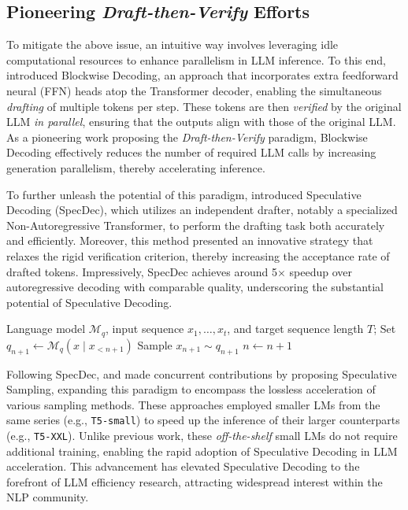 \subsection{Pioneering \textit{Draft-then-Verify} Efforts}
\label{sec:pioneering_efforts}
To mitigate the above issue, an intuitive way involves leveraging idle computational resources to enhance parallelism in LLM inference. To this end, \citet{Stern:2018blockwise} introduced Blockwise Decoding, an approach that incorporates extra feedforward neural (FFN) heads atop the Transformer decoder, enabling the simultaneous \textit{drafting} of multiple tokens per step. These tokens are then \textit{verified} by the original LLM \textit{in parallel}, ensuring that the outputs align with those of the original LLM. As a pioneering work proposing the \textit{Draft-then-Verify} paradigm, Blockwise Decoding effectively reduces the number of required LLM calls by increasing generation parallelism, thereby accelerating inference.

To further unleash the potential of this paradigm, \citet{xia:2022specdec} introduced Speculative Decoding (SpecDec), which utilizes an independent drafter, notably a specialized Non-Autoregressive Transformer, to perform the drafting task both accurately and efficiently. Moreover, this method presented an innovative strategy that relaxes the rigid verification criterion, thereby increasing the acceptance rate of drafted tokens. Impressively, SpecDec achieves around 5$\times$ speedup over autoregressive decoding with comparable quality, underscoring the substantial potential of Speculative Decoding.

\begin{algorithm}[t]
\small
\caption{Autoregressive Decoding}
\label{algo:ar}
\begin{algorithmic}[1]
\Require
Language model $\mathcal{M}_q$, input sequence $x_1,\dots,x_t$, and target sequence length $T$;
\State Set $q_{n+1} \gets \mathcal{M}_q\left(x\mid x_{< n+1}\right)$ 
\State Sample $x_{n+1} \sim q_{n+1}$ 
\State $n \gets n + 1$
\EndWhile
\end{algorithmic}
\end{algorithm}

Following SpecDec, \citet{Leviathan:2023specdec} and \citet{Chen:2023specsampling} made concurrent contributions by proposing Speculative Sampling, expanding this paradigm to encompass the lossless acceleration of various sampling methods. These approaches employed smaller LMs from the same series (e.g., \texttt{T5-small}) to speed up the inference of their larger counterparts (e.g., \texttt{T5-XXL}). Unlike previous work, these \textit{off-the-shelf} small LMs do not require additional training, enabling the rapid adoption of Speculative Decoding in LLM acceleration. This advancement has elevated Speculative Decoding to the forefront of LLM efficiency research, attracting widespread interest within the NLP community.

